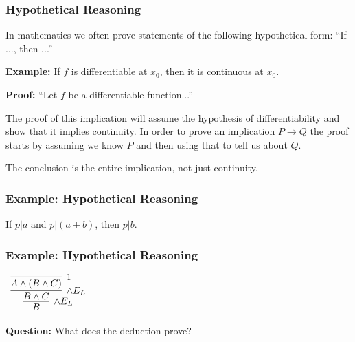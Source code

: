 \documentclass{beamer}
\begin{document}
\begin{frame}
	\frametitle{Hypothetical Reasoning}
	
	In mathematics we often prove statements of the following hypothetical form: ``If ..., then ...'' 
	
	\vspace{0.3cm}
	
	{\bf Example:} If $f$ is differentiable at $x_{0}$, then it is continuous at $x_{0}$.
	
	\vspace{0.3cm}

  	{\bf Proof:} ``Let $f$ be a differentiable function...''

  	\vspace{0.3cm}
	
	The proof of this implication will assume the hypothesis of differentiability and show that it implies continuity. In order to prove an implication $P \to Q$ the proof starts by assuming we know $P$ and then using that to tell us about $Q$. 
	
	\vspace{0.3cm} 
	
	The conclusion is the entire implication, not just continuity. 
	
	\vspace{1cm}
	
\end{frame}

\begin{frame}
\frametitle{Example: Hypothetical Reasoning}

	If $p | a$ and $p | (a + b)$, then $p | b$.

\vspace{6cm}	

\end{frame}

\begin{frame}
	\frametitle{Example: Hypothetical Reasoning}

	\begin{center}
		$\begin{array}{c}
			\infer[\land E_{L}]{B}
				{\infer[\land E_{L}]{B \land C}
					{\infer[1]{A \land (B \land C)}
						{}}}
		\end{array}$
	\end{center}

	\vspace{4cm}

	{\bf Question:} What does the deduction prove?

\end{frame}
\end{document}
